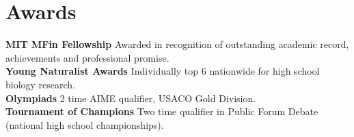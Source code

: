 \documentclass[letterpaper,11pt]{article}
\begin{document}
\section{Awards}
\begin{itemize}[leftmargin=0.15in, label={}]
	\small{\item{
			\textbf{MIT MFin Fellowship} {Awarded in recognition of outstanding academic record, achievements and professional promise.} \\
			\textbf{Young Naturalist Awards} {Individually top 6 nationwide for high school biology research.} \\
			\textbf{Olympiads} {2 time AIME qualifier, USACO Gold Division.} \\
			\textbf{Tournament of Champions} {Two time qualifier in Public Forum Debate (national high school championships).}
	}}
\end{itemize}


  
\end{document}
